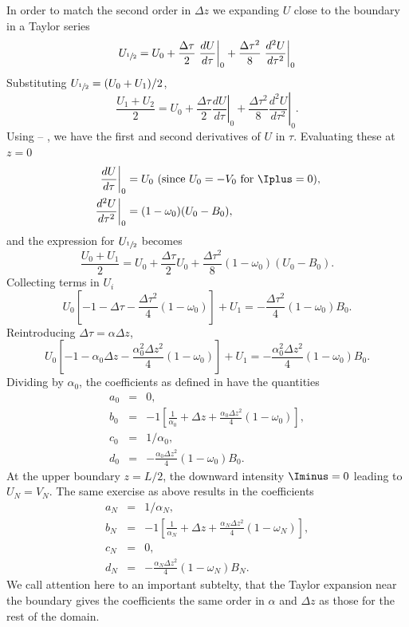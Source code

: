 In order to match the second order in $\Delta z$ we expanding $U$ close to the boundary in a Taylor series
\begin{equation}
    U_{\sfrac{1}{2}} = U_0 + \frac{\Delta \tau}{2} \left. \frac{dU}{d\tau} \right|_0 + \frac{\Delta \tau^2}{8} \left. \frac{d^2U}{d\tau^2}\right|_0
\end{equation}
Substituting $U_{\sfrac{1}{2}} = (U_0 + U_1)/2$,
\begin{equation}
    \frac{U_1 + U_2}{2} = U_0 + \frac{\Delta \tau}{2} \left. \frac{dU}{d\tau} \right|_0 + \frac{\Delta \tau^2}{8} \left. \frac{d^2U}{d\tau^2}\right|_0.
\end{equation}
Using  -- , we have the first and second derivatives of $U$ in $\tau$.
Evaluating these at $z=0$
\begin{align}
    \left. \frac{dU}{d\tau} \right|_0 &= U_0 \text{  (since}\ U_0=-V_0 \text{ for } \Iplus=0), \\
    \left. \frac{d^2U}{d\tau^2}\right|_0 &= (1-\omega_0)(U_0-B_0),
\end{align}
and the expression for $U_{\sfrac{1}{2}}$ becomes
\begin{equation}
    \frac{U_0 + U_1}{2} = U_0 + \frac{\Delta \tau}{2} U_0 + \frac{\Delta \tau^2}{8} (1-\omega_0)(U_0-B_0).
\end{equation}
Collecting terms in $U_i$
\begin{equation}
    U_0 \left[ -1-\Delta \tau - \frac{\Delta \tau^2}{4}(1-\omega_0) \right] + U_1 = - \frac{\Delta \tau^2}{4}(1-\omega_0)B_0.
\end{equation}
Reintroducing $\Delta \tau =\alpha \Delta z$,
\begin{equation}
    U_0 \left[ -1-\alpha_0\Delta z - \frac{\alpha_0^2\Delta z^2}{4}(1-\omega_0) \right] + U_1 = - \frac{\alpha_0^2\Delta z^2}{4}(1-\omega_0)B_0.
\end{equation}
Dividing by $\alpha_0$, the coefficients as defined in  have the quantities
\begin{eqnarray}
    a_0 &=& 0, \\
    b_0 &=& -1\left[ \frac{1}{\alpha_0} + \Delta z + \frac{\alpha_0 \Delta z^2}{4}(1-\omega_0) \right], \\
    c_0 &=& 1/\alpha_{0}, \\
    d_0 &=& - \frac{\alpha_0 \Delta z^2}{4}(1-\omega_0) B_0.
\end{eqnarray}
At the upper boundary $z=L/2$, the downward intensity $\Iminus=0$ leading to $U_N=V_N$.
The same exercise as above results in the coefficients
\begin{eqnarray}
    a_N &=& 1/\alpha_N, \\
    b_N &=& -1\left[ \frac{1}{\alpha_N} + \Delta z + \frac{\alpha_N \Delta z^2}{4}(1-\omega_N) \right], \\
    c_N &=& 0, \\
    d_N &=& - \frac{\alpha_N \Delta z^2}{4}(1-\omega_N) B_N.
\end{eqnarray}
We call attention here to an important subtelty, that the Taylor expansion near the boundary gives the coefficients the same order in $\alpha$ and $\Delta z$ as those for the rest of the domain.

